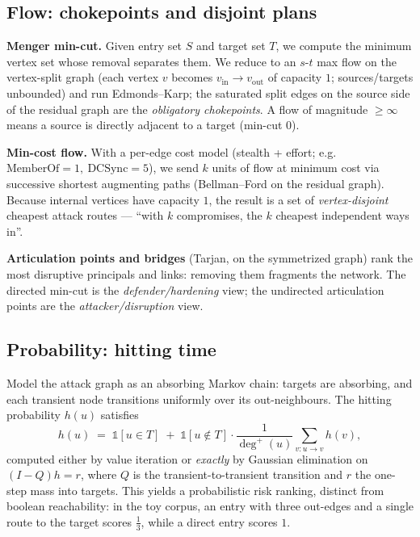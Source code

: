 \documentclass[11pt]{article}
\begin{document}
\subsection{Flow: chokepoints and disjoint plans}
\textbf{Menger min-cut.} Given entry set $S$ and target set $T$, we compute the
minimum vertex set whose removal separates them. We reduce to an $s$-$t$ max flow
on the vertex-split graph (each vertex $v$ becomes $v_{\mathrm{in}}\to
v_{\mathrm{out}}$ of capacity $1$; sources/targets unbounded) and run
Edmonds--Karp; the saturated split edges on the source side of the residual graph
are the \emph{obligatory chokepoints}. A flow of magnitude $\geq \infty$ means a
source is directly adjacent to a target (min-cut $0$).

\textbf{Min-cost flow.} With a per-edge cost model (stealth + effort; e.g.\
$\text{MemberOf}=1,\ \text{DCSync}=5$), we send $k$ units of flow at minimum cost
via successive shortest augmenting paths (Bellman--Ford on the residual graph).
Because internal vertices have capacity $1$, the result is a set of
\emph{vertex-disjoint} cheapest attack routes --- ``with $k$ compromises, the $k$
cheapest independent ways in''.

\textbf{Articulation points and bridges} (Tarjan, on the symmetrized graph) rank
the most disruptive principals and links: removing them fragments the network.
The directed min-cut is the \emph{defender/hardening} view; the undirected
articulation points are the \emph{attacker/disruption} view.

\subsection{Probability: hitting time}
Model the attack graph as an absorbing Markov chain: targets are absorbing, and
each transient node transitions uniformly over its out-neighbours. The hitting
probability $h(u)$ satisfies
\[
h(u) \;=\; \mathbb{1}[u \in T] \;+\; \mathbb{1}[u\notin T]\cdot
   \frac{1}{\deg^+(u)}\sum_{v : u\to v} h(v),
\]
computed either by value iteration or \emph{exactly} by Gaussian elimination on
$(I-Q)h = r$, where $Q$ is the transient-to-transient transition and $r$ the
one-step mass into targets. This yields a probabilistic risk ranking, distinct
from boolean reachability: in the toy corpus, an entry with three out-edges and a
single route to the target scores $\tfrac13$, while a direct entry scores $1$.
\end{document}
